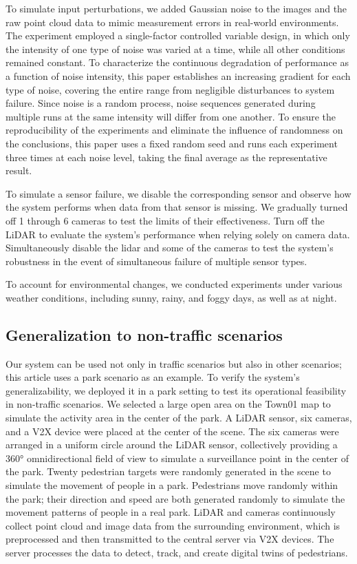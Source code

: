 \documentclass[lineno,pdflatex,sn-basic]{sn-jnl}%
\theoremstyle{thmstyleone}%
\theoremstyle{thmstyletwo}%
\theoremstyle{thmstylethree}%
\begin{document}
To simulate input perturbations, we added Gaussian noise to the images and the raw point cloud data to mimic measurement errors in real-world environments.
The experiment employed a single-factor controlled variable design, in which only the intensity of one type of noise was varied at a time, while all other conditions remained constant.
To characterize the continuous degradation of performance as a function of noise intensity, this paper establishes an increasing gradient for each type of noise, covering the entire range from negligible disturbances to system failure.
Since noise is a random process, noise sequences generated during multiple runs at the same intensity will differ from one another.
To ensure the reproducibility of the experiments and eliminate the influence of randomness on the conclusions, this paper uses a fixed random seed and runs each experiment three times at each noise level, taking the final average as the representative result.

To simulate a sensor failure, we disable the corresponding sensor and observe how the system performs when data from that sensor is missing.
We gradually turned off 1 through 6 cameras to test the limits of their effectiveness.
Turn off the LiDAR to evaluate the system's performance when relying solely on camera data.
Simultaneously disable the lidar and some of the cameras to test the system's robustness in the event of simultaneous failure of multiple sensor types.

To account for environmental changes, we conducted experiments under various weather conditions, including sunny, rainy, and foggy days, as well as at night.


\subsection{Generalization to non-traffic scenarios}
Our system can be used not only in traffic scenarios but also in other scenarios; this article uses a park scenario as an example.
To verify the system's generalizability, we deployed it in a park setting to test its operational feasibility in non-traffic scenarios.
We selected a large open area on the Town01 map to simulate the activity area in the center of the park.
A LiDAR sensor, six cameras, and a V2X device were placed at the center of the scene. The six cameras were arranged in a uniform circle around the LiDAR sensor, collectively providing a 360° omnidirectional field of view to simulate a surveillance point in the center of the park.
Twenty pedestrian targets were randomly generated in the scene to simulate the movement of people in a park.
Pedestrians move randomly within the park; their direction and speed are both generated randomly to simulate the movement patterns of people in a real park.
LiDAR and cameras continuously collect point cloud and image data from the surrounding environment, which is preprocessed and then transmitted to the central server via V2X devices.
The server processes the data to detect, track, and create digital twins of pedestrians.
\end{document}
